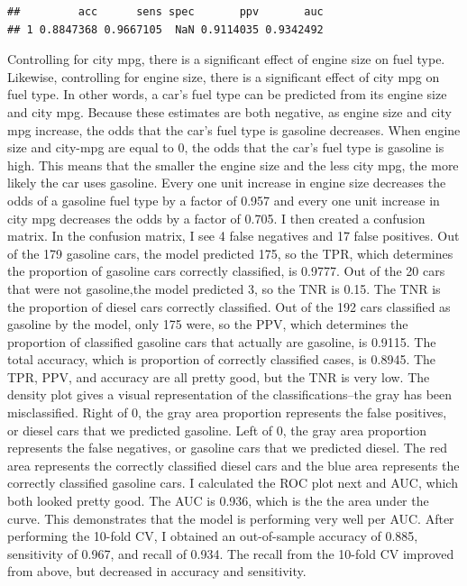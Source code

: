 \documentclass[]{article}
\begin{document}
\begin{verbatim}
##         acc      sens spec       ppv       auc
## 1 0.8847368 0.9667105  NaN 0.9114035 0.9342492
\end{verbatim}

Controlling for city mpg, there is a significant effect of engine size
on fuel type. Likewise, controlling for engine size, there is a
significant effect of city mpg on fuel type. In other words, a car's
fuel type can be predicted from its engine size and city mpg. Because
these estimates are both negative, as engine size and city mpg increase,
the odds that the car's fuel type is gasoline decreases. When engine
size and city-mpg are equal to 0, the odds that the car's fuel type is
gasoline is high. This means that the smaller the engine size and the
less city mpg, the more likely the car uses gasoline. Every one unit
increase in engine size decreases the odds of a gasoline fuel type by a
factor of 0.957 and every one unit increase in city mpg decreases the
odds by a factor of 0.705. I then created a confusion matrix. In the
confusion matrix, I see 4 false negatives and 17 false positives. Out of
the 179 gasoline cars, the model predicted 175, so the TPR, which
determines the proportion of gasoline cars correctly classified, is
0.9777. Out of the 20 cars that were not gasoline,the model predicted 3,
so the TNR is 0.15. The TNR is the proportion of diesel cars correctly
classified. Out of the 192 cars classified as gasoline by the model,
only 175 were, so the PPV, which determines the proportion of classified
gasoline cars that actually are gasoline, is 0.9115. The total accuracy,
which is proportion of correctly classified cases, is 0.8945. The TPR,
PPV, and accuracy are all pretty good, but the TNR is very low. The
density plot gives a visual representation of the classifications--the
gray has been misclassified. Right of 0, the gray area proportion
represents the false positives, or diesel cars that we predicted
gasoline. Left of 0, the gray area proportion represents the false
negatives, or gasoline cars that we predicted diesel. The red area
represents the correctly classified diesel cars and the blue area
represents the correctly classified gasoline cars. I calculated the ROC
plot next and AUC, which both looked pretty good. The AUC is 0.936,
which is the the area under the curve. This demonstrates that the model
is performing very well per AUC. After performing the 10-fold CV, I
obtained an out-of-sample accuracy of 0.885, sensitivity of 0.967, and
recall of 0.934. The recall from the 10-fold CV improved from above, but
decreased in accuracy and sensitivity.
\end{document}

